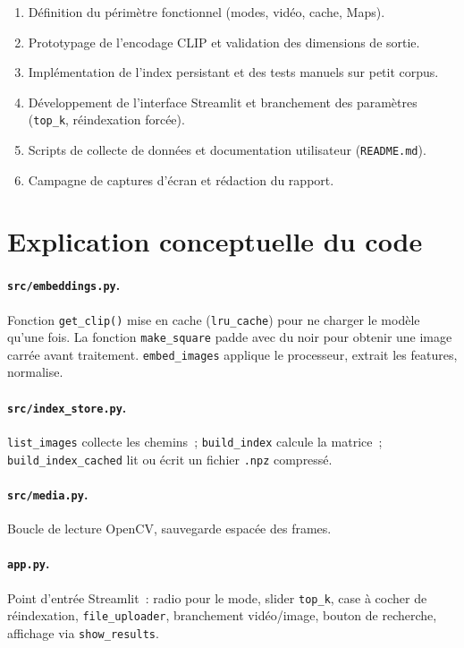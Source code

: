 \documentclass[11pt,a4paper,openany]{report}
\begin{document}
\begin{enumerate}[leftmargin=*]
  \item Définition du périmètre fonctionnel (modes, vidéo, cache, Maps).
  \item Prototypage de l'encodage CLIP et validation des dimensions de sortie.
  \item Implémentation de l'index persistant et des tests manuels sur petit corpus.
  \item Développement de l'interface Streamlit et branchement des paramètres (\texttt{top\_k}, réindexation forcée).
  \item Scripts de collecte de données et documentation utilisateur (\texttt{README.md}).
  \item Campagne de captures d'écran et rédaction du rapport.
\end{enumerate}

\section{Explication conceptuelle du code}

\paragraph{\texttt{src/embeddings.py}.} Fonction \texttt{get\_clip()} mise en cache (\texttt{lru\_cache}) pour ne charger le modèle qu'une fois. La fonction \texttt{make\_square} padde avec du noir pour obtenir une image carrée avant traitement. \texttt{embed\_images} applique le processeur, extrait les features, normalise.

\paragraph{\texttt{src/index\_store.py}.} \texttt{list\_images} collecte les chemins~; \texttt{build\_index} calcule la matrice~; \texttt{build\_index\_cached} lit ou écrit un fichier \texttt{.npz} compressé.

\paragraph{\texttt{src/media.py}.} Boucle de lecture OpenCV, sauvegarde espacée des frames.

\paragraph{\texttt{app.py}.} Point d'entrée Streamlit~: radio pour le mode, slider \texttt{top\_k}, case à cocher de réindexation, \texttt{file\_uploader}, branchement vidéo/image, bouton de recherche, affichage via \texttt{show\_results}.
\end{document}
